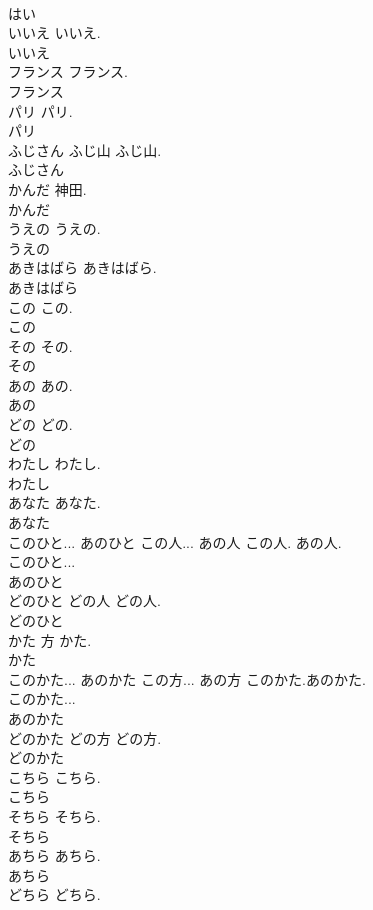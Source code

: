 \documentclass[8pt]{extreport}
\begin{document}
\begin{CJK}{UTF8}{min}
\\	はい
\\	いいえ		いいえ.	
\\	いいえ
\\	フランス		フランス.	
\\	フランス
\\	パリ		パリ.	
\\	パリ
\\	ふじさん	ふじ山	ふじ山.	
\\	ふじさん
\\	かんだ		神田.	
\\	かんだ
\\	うえの		うえの.	
\\	うえの
\\	あきはばら		あきはばら.	
\\	あきはばら
\\	この		この.	
\\	この
\\	その		その.	
\\	その
\\	あの		あの.	
\\	あの
\\	どの		どの.	
\\	どの
\\	わたし		わたし.	
\\	わたし
\\	あなた		あなた.	
\\	あなた
\\	このひと... あのひと	この人... あの人	この人. あの人.	
\\	このひと...
\\	あのひと
\\	どのひと	どの人	どの人.	
\\	どのひと
\\	かた	方	かた.	
\\	かた
\\	このかた... あのかた	この方... あの方	このかた.あのかた.	
\\	このかた...
\\	あのかた
\\	どのかた	どの方	どの方.	
\\	どのかた
\\	こちら		こちら.	
\\	こちら
\\	そちら		そちら.	
\\	そちら
\\	あちら		あちら.	
\\	あちら
\\	どちら		どちら.	

\end{CJK}
\end{document}
